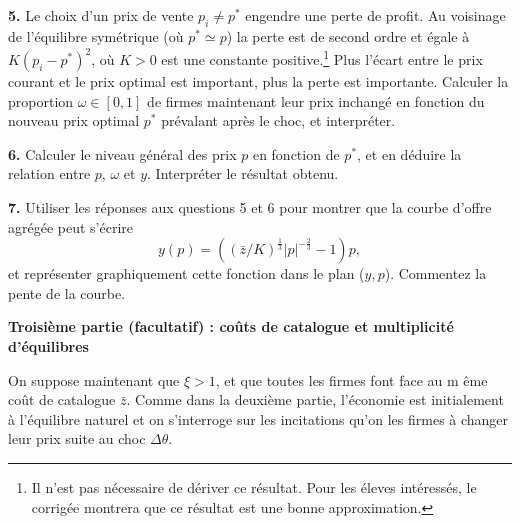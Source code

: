 \documentclass[11pt,a4paper]{article}
\begin{document}
\bigskip

\noindent \textbf{5.} Le choix d'un prix de vente $p_{i}\neq p^{\ast }$ engendre une perte de profit. Au voisinage de l'\'{e}quilibre sym\'{e}trique (o\`{u} $p^{\ast }\simeq p$) la perte est de second ordre et égale \`{a} $K \left(p_ {i} -p ^ {\ast} \right) ^ {2} $, o\`{u} $ K> 0 $ est une constante positive.\footnote{Il n'est pas nécessaire de dériver ce résultat. Pour les éleves intéressés,  le corrigée montrera que ce résultat est une bonne approximation.} Plus l'écart entre le prix courant  et le prix optimal  est important, plus la perte est importante.  Calculer la proportion $\omega \in \left[ 0,1\right] $
de firmes maintenant leur prix inchang\'{e} en fonction du nouveau prix
optimal $p^{\ast }$ pr\'{e}valant apr\`{e}s le choc, et interpr\'{e}ter.

\bigskip

\noindent \textbf{6.} Calculer le niveau g\'{e}n\'{e}ral des prix $p$ en
fonction de $p^{\ast }$, et en d\'{e}duire la relation entre $p$, $\omega $
et $y.$ Interpr\'{e}ter le r\'{e}sultat obtenu.

\bigskip

\noindent \textbf{7.} Utiliser les r\'{e}ponses aux questions 5 et 6 pour
montrer que la courbe d'offre agr\'{e}g\'{e}e peut s'\'{e}crire%
\begin{equation}
y\left( p\right) =\left( \left( \bar{z}/K\right) ^{\frac{1}{3}}\left\vert
p\right\vert ^{-\frac{2}{3}}-1\right) p,  \tag{OA}
\end{equation}%
et repr\'{e}senter graphiquement cette fonction dans le plan ($y,p$). Commentez la pente de la courbe. 


\vspace{1cm}

\noindent \textbf{Troisi\`{e}me partie (facultatif) : co\^{u}ts de catalogue
et multiplicit\'{e} d'\'{e}quilibres}

\bigskip

On suppose maintenant que $\xi >1$, et que toutes les firmes font face au m%
\^{e}me co\^{u}t de catalogue $\bar{z} $. Comme dans la deuxi\`{e}me
partie, l'\'{e}conomie est initialement \`{a} l'\'{e}quilibre naturel et on
s'interroge sur les incitations qu'on les firmes \`{a} changer leur prix
suite au choc $\Delta \theta$.
\end{document}
